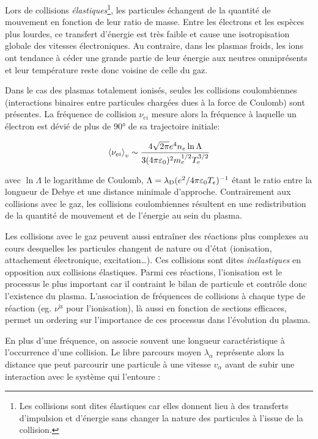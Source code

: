 \begin{refsection}
Lors de collisions
\emph{élastiques}\footnote{Les collisions sont dites élastiques car elles
donnent lieu à des transferts d'impulsion et d'énergie sans changer la nature
des particules à l'issue de la collision.}, les particules échangent de la
quantité de mouvement en fonction de leur ratio de masse. Entre les électrons
et les espèces plus lourdes, ce transfert d'énergie est très faible et cause
une isotropisation globale des vitesses électroniques. Au contraire, dans les
plasmas froids, les ions ont
tendance à céder une grande partie de leur énergie aux
neutres omniprésents et leur température reste donc voisine de celle du gaz. 

Dans le cas des plasmas totalement ionisés, seules les collisions coulombiennes 
(interactions binaires entre particules chargées dues à la force de Coulomb)
sont présentes. 
La fréquence de collision $\nu_{ei}$ mesure alors la fréquence à laquelle un
électron est dévié de plus de 90° de sa trajectoire initiale:

\begin{equation}
	\left<\nu_{ei}\right>_v\sim\frac{4\sqrt{2\pi}e^{{4}} n_{e} \ln\Lambda
	}{3(4\pi\varepsilon{_{0}})^{{2}}m_{e}^{{1/2}}T_{e}^{{3/2}}}
\end{equation}

avec $\ln \Lambda$ le logarithme de Coulomb,
$\Lambda=\lambda_\text{D}(e^{{2}}/4\pi\varepsilon{_{0}}
T_{e})^{{-1}}$ étant le ratio entre la longueur de Debye et une
distance minimale d'approche.
Contrairement aux collisions avec le gaz, les
collisions coulombiennes résultent en une redistribution de la quantité de
mouvement et de l'énergie au sein du plasma.

Les collisions avec le gaz peuvent aussi entraîner des réactions plus complexes
au cours desquelles les particules changent de nature ou d'état (ionisation,
attachement électronique, excitation\ldots).
Ces collisions sont dites \emph{inélastiques} en opposition aux collisions
élastiques. Parmi ces réactions, l'ionisation est le processus le plus
important car il contraint le bilan de particule et contrôle donc l'existence
du plasma. L'association de fréquences de collisions à chaque type de réaction
(eg. $\nu^\text{iz}$ pour l'ionisation), là aussi en fonction de sections
efficaces, permet un ordering sur l'importance de ces processus dans l'évolution
du plasma.

En plus d'une fréquence, on associe souvent une longueur caractéristique
à l'occurrence d'une collision. Le libre parcours moyen $\lambda_\alpha$
représente alors la distance que peut parcourir une particule à une vitesse
$v_\alpha$ avant de subir une interaction avec le système qui l'entoure :


\end{refsection}
